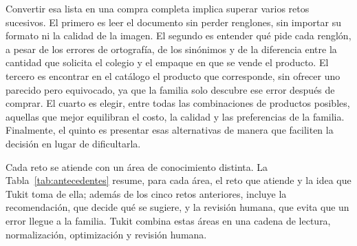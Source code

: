 Convertir esa lista en una compra completa implica superar varios retos sucesivos. El
primero es leer el documento sin perder renglones, sin importar su formato ni la calidad de
la imagen. El segundo es entender qué pide cada renglón, a pesar de los errores de
ortografía, de los sinónimos y de la diferencia entre la cantidad que solicita el colegio y
el empaque en que se vende el producto. El tercero es encontrar en el catálogo el producto
que corresponde, sin ofrecer uno parecido pero equivocado, ya que la familia solo descubre
ese error después de comprar. El cuarto es elegir, entre todas las combinaciones de
productos posibles, aquellas que mejor equilibran el costo, la calidad y las preferencias de
la familia. Finalmente, el quinto es presentar esas alternativas de manera que faciliten la
decisión en lugar de dificultarla.\par

Cada reto se atiende con un área de conocimiento distinta. La Tabla~\ref{tab:antecedentes} resume, para
cada área, el reto que atiende y la idea que Tukit toma de ella; además de los cinco retos anteriores,
incluye la recomendación, que decide qué se sugiere, y la revisión humana, que evita que un error llegue
a la familia. Tukit combina estas áreas en una cadena de lectura, normalización, optimización y revisión
humana.\par

